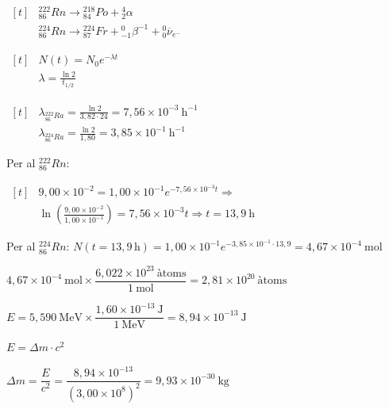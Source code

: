 \begin{solapartat}
$\begin{aligned}[t]
&{}^{222}_{86}Rn \rightarrow {}^{218}_{84}Po + {}^{4}_{2}\alpha\\
&{}^{224}_{86}Rn \rightarrow {}^{224}_{87}Fr + {}^{0}_{-1}\beta^{-1} + {}^{0}_{0}\overline{\nu}_{e^-}
\end{aligned}$

\medskip
$\begin{aligned}[t]
&N(t) = N_0 e^{-\lambda t}\\
&\lambda = \frac{\ln 2}{t_{1/2}}
\end{aligned}$

\medskip
$\begin{aligned}[t]
&\lambda_{{}^{222}_{86}Ra} = \frac{\ln 2}{3,82\cdot 24} = 7,56\times 10^{-3}\ \mathrm{h^{-1}}\\
&\lambda_{{}^{224}_{86}Ra} = \frac{\ln 2}{1,80} = 3,85\times 10^{-1}\ \mathrm{h^{-1}}
\end{aligned}$

\medskip
Per al ${}^{222}_{86}Rn$:

$\begin{aligned}[t]
&9,00\times 10^{-2} = 1,00\times 10^{-1} e^{-7,56\times 10^{-3} t} \Rightarrow\\
&\ln\left(\frac{9,00\times 10^{-2}}{1,00\times 10^{-1}}\right) = 7,56\times 10^{-3} t \Rightarrow t = 13,9\ \mathrm{h}
\end{aligned}$

\medskip
{} Per al ${}^{224}_{86}Rn$: \quad $N(t = 13,9\,\mathrm{h}) = 1,00\times 10^{-1} e^{-3,85\times 10^{-1}\cdot 13,9} = 4,67\times 10^{-4}\ \mathrm{mol}$

\medskip
{} $4,67\times 10^{-4}\ \mathrm{mol} \times \dfrac{6,022\times 10^{23}\ \text{àtoms}}{1\ \mathrm{mol}} = 2,81\times 10^{20}\ \text{àtoms}$
\end{solapartat}

\begin{solapartat}
 $E = 5,590\ \mathrm{MeV} \times \dfrac{1,60\times 10^{-13}\ \mathrm{J}}{1\ \mathrm{MeV}} = 8,94\times 10^{-13}\ \mathrm{J}$

\medskip
{} $E = \Delta m\cdot c^2$

\medskip
{} $\Delta m = \dfrac{E}{c^2} = \dfrac{8,94\times 10^{-13}}{\left(3,00\times 10^{8}\right)^2} = 9,93\times 10^{-30}\ \mathrm{kg}$
\end{solapartat}

